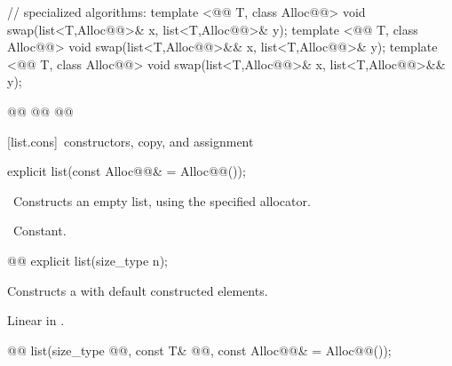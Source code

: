 \documentclass[american,twoside]{book}
\begin{document}
\begin{codeblock}
{  // specialized algorithms:
  template <@@ T, class Alloc@@>
    void swap(list<T,Alloc@@>& x, list<T,Alloc@@>& y);
  template <@@ T, class Alloc@@>
    void swap(list<T,Alloc@@>&& x, list<T,Alloc@@>& y);
  template <@@ T, class Alloc@@>
    void swap(list<T,Alloc@@>& x, list<T,Alloc@@>&& y);

  @@
    @@
      @@
}
\end{codeblock}

[list.cons]{\ constructors, copy, and assignment}

\begin{itemdecl}
explicit list(const Alloc@@& = Alloc@@());
\end{itemdecl}

\begin{itemdescr}
\pnum
\effects\ 
Constructs an empty list, using the specified allocator.

\pnum
\complexity\ 
Constant.
\end{itemdescr}

\begin{itemdecl}
@@ explicit list(size_type n);
\end{itemdecl}

\begin{itemdescr}
\pnum
\effects Constructs a  with
 default constructed elements.

\pnum
{}

\pnum
\complexity
Linear in
.
\end{itemdescr}

\begin{itemdecl}
@@
  list(size_type @@, const T& @@,
                const Alloc@@& = Alloc@\removedConcepts{ator}@());
\end{itemdecl}
\end{document}

